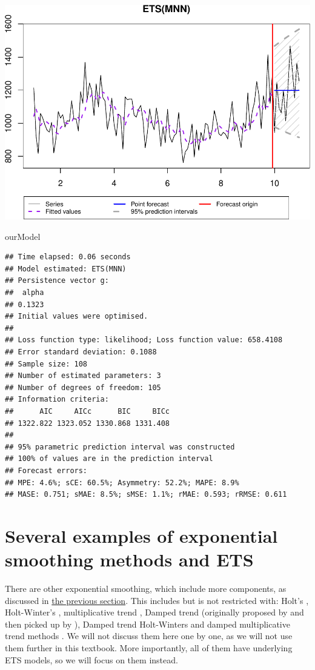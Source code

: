 \documentclass[
]{book}
\newenvironment{Shaded}{\begin{snugshade}}{\end{snugshade}}
\newcommand{\NormalTok}[1]{#1}
\theoremstyle{definition}
\theoremstyle{definition}
\theoremstyle{definition}
\theoremstyle{definition}
\theoremstyle{remark}
\begin{document}
\includegraphics{adam_files/figure-latex/ETSMNNExample-1.pdf}

\begin{Shaded}
\begin{Highlighting}[]
\NormalTok{ourModel}
\end{Highlighting}
\end{Shaded}

\begin{verbatim}
## Time elapsed: 0.06 seconds
## Model estimated: ETS(MNN)
## Persistence vector g:
##  alpha 
## 0.1323 
## Initial values were optimised.
## 
## Loss function type: likelihood; Loss function value: 658.4108
## Error standard deviation: 0.1088
## Sample size: 108
## Number of estimated parameters: 3
## Number of degrees of freedom: 105
## Information criteria:
##      AIC     AICc      BIC     BICc 
## 1322.822 1323.052 1330.868 1331.408 
## 
## 95% parametric prediction interval was constructed
## 100% of values are in the prediction interval
## Forecast errors:
## MPE: 4.6%; sCE: 60.5%; Asymmetry: 52.2%; MAPE: 8.9%
## MASE: 0.751; sMAE: 8.5%; sMSE: 1.1%; rMAE: 0.593; rRMSE: 0.611
\end{verbatim}

\hypertarget{ETSExamples}{%
\section{Several examples of exponential smoothing methods and ETS}\label{ETSExamples}}

There are other exponential smoothing, which include more components, as discussed in \protect\hyperlink{tsComponents}{the previous section}. This includes but is not restricted with: Holt's \citep[originally proposed in 1957]{Holt2004b}, Holt-Winter's \citep{Winters1960}, multiplicative trend \citep{Pegels1969}, Damped trend (originally proposed by \citet{Roberts1982} and then picked up by \citet{Gardner1985a}), Damped trend Holt-Winters \citep{Gardner1989} and damped multiplicative trend methods \citep{Taylor2003}. We will not discuss them here one by one, as we will not use them further in this textbook. More importantly, all of them have underlying ETS models, so we will focus on them instead.
\end{document}
